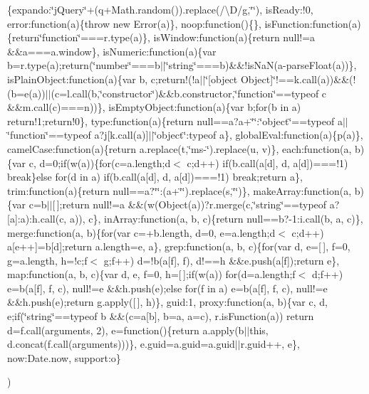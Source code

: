 {\begin{DoxyParamCaption}
\item[{}]{\{expando\+:\char`\"{}j\+Query\char`\"{}+(q+\+Math.\+random()).\+replace(/\textbackslash{}\+D/g,\char`\"{}\char`\"{}), is\+Ready\+:!0, error\+:function(a)\{throw new Error(a)\}, noop\+:function()\{\}, is\+Function\+:function(a)\{return\char`\"{}function\char`\"{}===r.\+type(a)\}, is\+Window\+:function(a)\{return null!=a \&\&a===a.\+window\}, is\+Numeric\+:function(a)\{var b=r.\+type(a);return(\char`\"{}number\char`\"{}===b$\vert$$\vert$\char`\"{}string\char`\"{}===b)\&\&!is\+Na\+N(a-\/parse\+Float(a))\}, is\+Plain\+Object\+:function(a)\{var b, c;return!(!a$\vert$$\vert$\char`\"{}\mbox{[}object Object\mbox{]}\char`\"{}!==k.\+call(a))\&\&(!(b=e(a))$\vert$$\vert$(c=l.\+call(b,\char`\"{}constructor\char`\"{})\&\&b.\+constructor,\char`\"{}function\char`\"{}==typeof c \&\&m.\+call(c)===n))\}, is\+Empty\+Object\+:function(a)\{var b;for(b in a) return!1;return!0\}, type\+:function(a)\{return null==a?a+\char`\"{}\char`\"{}\+:\char`\"{}object\char`\"{}==typeof a$\vert$$\vert$\char`\"{}function\char`\"{}==typeof a?j\mbox{[}k.\+call(a)\mbox{]}$\vert$$\vert$\char`\"{}object\char`\"{}\+:typeof a\}, global\+Eval\+:function(a)\{p(a)\}, camel\+Case\+:function(a)\{return a.\+replace(t,\char`\"{}ms-\/\char`\"{}).\+replace(u, v)\}, each\+:function(a, b)\{var c, d=0;if(w(a))\{for(c=a.\+length;d$<$ c;d++) if(b.\+call(a\mbox{[}d\mbox{]}, d, a\mbox{[}d\mbox{]})===!1) break\}else for(d in a) if(b.\+call(a\mbox{[}d\mbox{]}, d, a\mbox{[}d\mbox{]})===!1) break;return a\}, trim\+:function(a)\{return null==a?\char`\"{}\char`\"{}\+:(a+\char`\"{}\char`\"{}).\+replace(s,\char`\"{}\char`\"{})\}, make\+Array\+:function(a, b)\{var c=b$\vert$$\vert$\mbox{[}$\,$\mbox{]};return null!=a \&\&(w(\+Object(a))?r.\+merge(c,\char`\"{}string\char`\"{}==typeof a?\mbox{[}a\mbox{]}\+:a)\+:h.\+call(c, a)), c\}, in\+Array\+:function(a, b, c)\{return null==b?-\/1\+:i.\+call(b, a, c)\}, merge\+:function(a, b)\{for(var c=+b.\+length, d=0, e=a.\+length;d$<$ c;d++) a\mbox{[}e++\mbox{]}=b\mbox{[}d\mbox{]};return a.\+length=e, a\}, grep\+:function(a, b, c)\{for(var d, e=\mbox{[}$\,$\mbox{]}, f=0, g=a.\+length, h=!c;f$<$ g;f++) d=!b(a\mbox{[}f\mbox{]}, f), d!==h \&\&e.\+push(a\mbox{[}f\mbox{]});return e\}, map\+:function(a, b, c)\{var d, e, f=0, h=\mbox{[}$\,$\mbox{]};if(w(a)) for(d=a.\+length;f$<$ d;f++) e=b(a\mbox{[}f\mbox{]}, f, c), null!=e \&\&h.\+push(e);else for(f in a) e=b(a\mbox{[}f\mbox{]}, f, c), null!=e \&\&h.\+push(e);return g.\+apply(\mbox{[}$\,$\mbox{]}, h)\}, guid\+:1, proxy\+:function(a, b)\{var c, d, e;if(\char`\"{}string\char`\"{}==typeof b \&\&(c=a\mbox{[}b\mbox{]}, b=a, a=c), r.\+is\+Function(a)) return d=f.\+call(arguments, 2), e=function()\{return a.\+apply(b$\vert$$\vert$this, d.\+concat(f.\+call(arguments)))\}, e.\+guid=a.\+guid=a.\+guid$\vert$$\vert$r.\+guid++, e\}, now\+:\+Date.\+now, support\+:o\}}
\end{DoxyParamCaption}
)}\hypertarget{jquery-3_8js_a4eda24b0930800850740b9b1313393a3}{}\label{jquery-3_8js_a4eda24b0930800850740b9b1313393a3}
